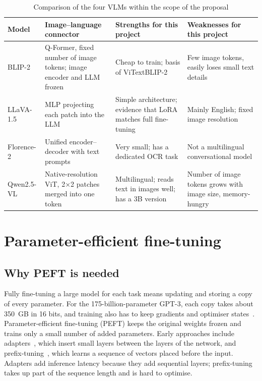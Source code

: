 \begin{table}[htbp]
\caption{Comparison of the four VLMs within the scope of the proposal}
\label{tab:rel-vlm}
\centering
\small
\begin{tabular}{p{}p{}p{}p{}}
\toprule
\textbf{Model} & \textbf{Image--language connector} & \textbf{Strengths for this project} & \textbf{Weaknesses for this project} \\
\midrule
BLIP-2 & Q-Former, fixed number of image tokens; image encoder and LLM frozen & Cheap to train; basis of ViTextBLIP-2 & Few image tokens, easily loses small text details \\
LLaVA-1.5 & MLP projecting each patch into the LLM & Simple architecture; evidence that LoRA matches full fine-tuning & Mainly English; fixed image resolution \\
Florence-2 & Unified encoder--decoder with text prompts & Very small; has a dedicated OCR task & Not a multilingual conversational model \\
Qwen2.5-VL & Native-resolution ViT, 2×2 patches merged into one token & Multilingual; reads text in images well; has a 3B version & Number of image tokens grows with image size, memory-hungry \\
\bottomrule
\end{tabular}
\end{table}

\section{Parameter-efficient fine-tuning}
\label{sec:rel-peft}

\subsection{Why PEFT is needed}

Fully fine-tuning a large model for each task means updating and storing a copy of
every parameter. For the 175-billion-parameter GPT-3, each copy takes about 350~GB in
16 bits, and training also has to keep gradients and optimiser
states~\cite{hu2022lora}. Parameter-efficient fine-tuning (PEFT) keeps the original
weights frozen and trains only a small number of added parameters. Early
approaches include adapters~\cite{houlsby2019adapter}, which insert small layers between
the layers of the network, and prefix-tuning~\cite{li2021prefix}, which learns a
sequence of vectors placed before the input. Adapters add inference latency because
they add sequential layers; prefix-tuning takes up part of the sequence length and is
hard to optimise.

